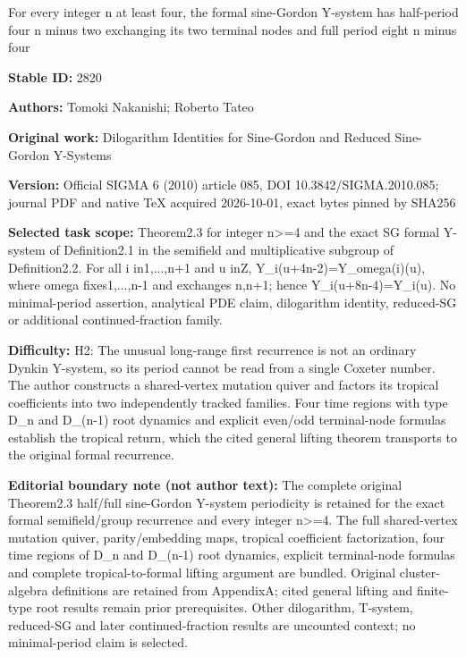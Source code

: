\documentclass[11pt]{article}
\numberwithin{equation}{section}
\theoremstyle{definition}
\begin{document}
\begin{center}\Large For every integer n at least four, the formal sine-Gordon Y-system has half-period four n minus two exchanging its two terminal nodes and full period eight n minus four\end{center}
\noindent\textbf{Stable ID:} 2820\par
\noindent\textbf{Authors:} Tomoki Nakanishi; Roberto Tateo\par
\noindent\textbf{Original work:} Dilogarithm Identities for Sine-Gordon and Reduced Sine-Gordon Y-Systems\par
\noindent\textbf{Version:} Official SIGMA 6 (2010) article 085, DOI 10.3842/SIGMA.2010.085; journal PDF and native TeX acquired 2026-10-01, exact bytes pinned by SHA256\par
\noindent\textbf{Selected task scope:} Theorem2.3 for integer n>=\allowbreak{}4 and the exact SG formal Y-system of Definition2.1 in the semifield and multiplicative subgroup of Definition2.2. For all i in1,...,n+\allowbreak{}1 and u inZ, Y\_i(u+\allowbreak{}4n-2)=\allowbreak{}Y\_omega(i)(u), where omega fixes1,...,n-1 and exchanges n,n+\allowbreak{}1; hence Y\_i(u+\allowbreak{}8n-4)=\allowbreak{}Y\_i(u). No minimal-period assertion, analytical PDE claim, dilogarithm identity, reduced-SG or additional continued-fraction family.\par
\noindent\textbf{Difficulty:} H2: The unusual long-range first recurrence is not an ordinary Dynkin Y-system, so its period cannot be read from a single Coxeter number. The author constructs a shared-vertex mutation quiver and factors its tropical coefficients into two independently tracked families. Four time regions with type D\_n and D\_(n-1) root dynamics and explicit even/odd terminal-node formulas establish the tropical return, which the cited general lifting theorem transports to the original formal recurrence.\par
\noindent\textbf{Editorial boundary note (not author text):} The complete original Theorem2.3 half/full sine-Gordon Y-system periodicity is retained for the exact formal semifield/group recurrence and every integer n>=\allowbreak{}4. The full shared-vertex mutation quiver, parity/embedding maps, tropical coefficient factorization, four time regions of D\_n and D\_(n-1) root dynamics, explicit terminal-node formulas and complete tropical-to-formal lifting argument are bundled. Original cluster-algebra definitions are retained from AppendixA; cited general lifting and finite-type root results remain prior prerequisites. Other dilogarithm, T-system, reduced-SG and later continued-fraction results are uncounted context; no minimal-period claim is selected.\par
\end{document}
